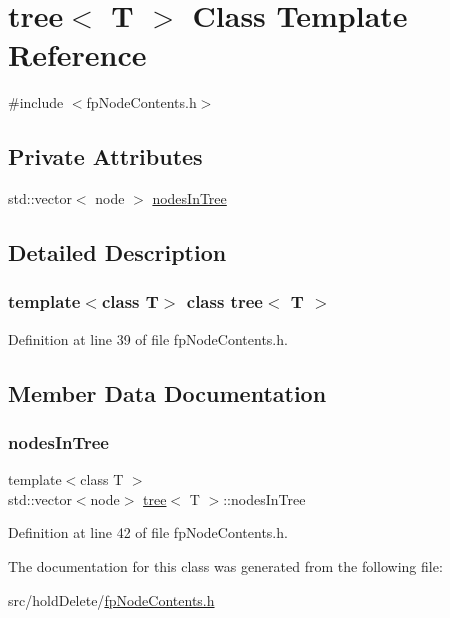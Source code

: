 \hypertarget{classtree}{}\section{tree$<$ T $>$ Class Template Reference}
\label{classtree}


{\ttfamily \#include $<$fp\+Node\+Contents.\+h$>$}

\subsection*{Private Attributes}
\begin{DoxyCompactItemize}
\item 
std\+::vector$<$ node $>$ \hyperlink{classtree_a4386628a5fc85bf646500fe70ea32609}{nodes\+In\+Tree}
\end{DoxyCompactItemize}


\subsection{Detailed Description}
\subsubsection*{template$<$class T$>$\newline
class tree$<$ T $>$}



Definition at line 39 of file fp\+Node\+Contents.\+h.



\subsection{Member Data Documentation}
\mbox{\label{classtree_a4386628a5fc85bf646500fe70ea32609}} 
\subsubsection{\texorpdfstring{nodes\+In\+Tree}{nodesInTree}}
{\footnotesize\ttfamily template$<$class T $>$ \\
std\+::vector$<$node$>$ \hyperlink{classtree}{tree}$<$ T $>$\+::nodes\+In\+Tree\hspace{0.3cm}{\ttfamily [private]}}



Definition at line 42 of file fp\+Node\+Contents.\+h.



The documentation for this class was generated from the following file\+:\begin{DoxyCompactItemize}
\item 
src/hold\+Delete/\hyperlink{fpNodeContents_8h}{fp\+Node\+Contents.\+h}\end{DoxyCompactItemize}
